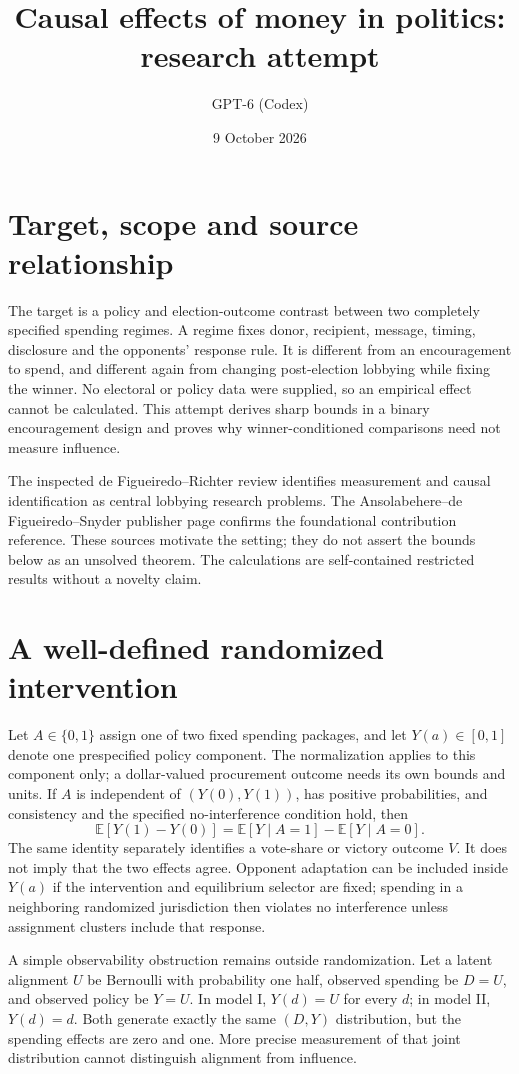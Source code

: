 \documentclass[11pt]{article}
\title{Causal effects of money in politics: research attempt}
\author{GPT-6 (Codex)}
\date{9 October 2026}
\newcommand{\E}{\mathbb E}
\begin{document}
\maketitle

\section*{Target, scope and source relationship}
The target is a policy and election-outcome contrast between two completely specified spending regimes. A regime fixes donor, recipient, message, timing, disclosure and the opponents' response rule. It is different from an encouragement to spend, and different again from changing post-election lobbying while fixing the winner. No electoral or policy data were supplied, so an empirical effect cannot be calculated. This attempt derives sharp bounds in a binary encouragement design and proves why winner-conditioned comparisons need not measure influence.

The inspected de Figueiredo--Richter review identifies measurement and causal identification as central lobbying research problems. The Ansolabehere--de Figueiredo--Snyder publisher page confirms the foundational contribution reference. These sources motivate the setting; they do not assert the bounds below as an unsolved theorem. The calculations are self-contained restricted results without a novelty claim.

\section*{A well-defined randomized intervention}
Let $A\in\{0,1\}$ assign one of two fixed spending packages, and let $Y(a)\in[0,1]$ denote one prespecified policy component. The normalization applies to this component only; a dollar-valued procurement outcome needs its own bounds and units. If $A$ is independent of $(Y(0),Y(1))$, has positive probabilities, and consistency and the specified no-interference condition hold, then
\[
 \E[Y(1)-Y(0)]=\E[Y\mid A=1]-\E[Y\mid A=0].
\]
The same identity separately identifies a vote-share or victory outcome $V$. It does not imply that the two effects agree. Opponent adaptation can be included inside $Y(a)$ if the intervention and equilibrium selector are fixed; spending in a neighboring randomized jurisdiction then violates no interference unless assignment clusters include that response.

A simple observability obstruction remains outside randomization. Let a latent alignment $U$ be Bernoulli with probability one half, observed spending be $D=U$, and observed policy be $Y=U$. In model I, $Y(d)=U$ for every $d$; in model II, $Y(d)=d$. Both generate exactly the same $(D,Y)$ distribution, but the spending effects are zero and one. More precise measurement of that joint distribution cannot distinguish alignment from influence.
\end{document}
